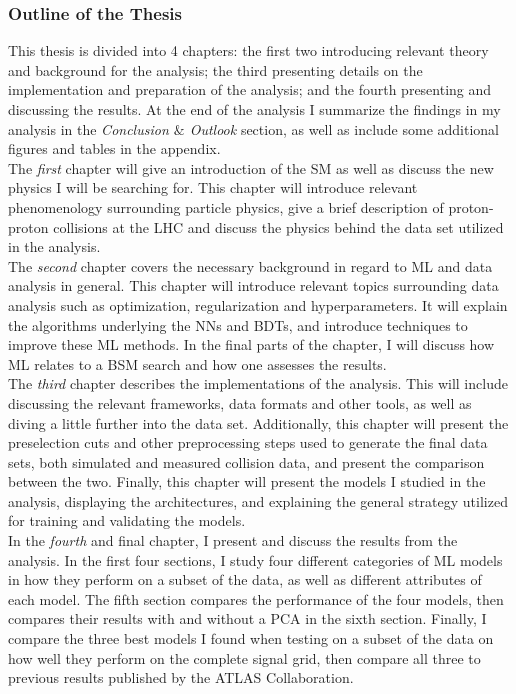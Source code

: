 \subsubsection*{Outline of the Thesis}
This thesis is divided into 4 chapters: the first two introducing relevant theory and background for the analysis; the third presenting
details on the implementation and preparation of the analysis; and the fourth presenting and discussing the results. At the end of the analysis I 
summarize the findings in my analysis in the \emph{Conclusion $\&$ Outlook} section, as well as include some additional figures and tables 
in the appendix. 
\\\newline
The \emph{first} chapter will give an introduction of the \ac{SM} as well as discuss the new physics I will be searching for. This chapter will 
introduce relevant phenomenology surrounding particle physics, give a brief description of proton-proton collisions at the \ac{LHC} and discuss 
the physics behind the data set utilized in the analysis. 
\\\newline
The \emph{second} chapter covers the necessary background in regard to \ac{ML} and data analysis in general. This chapter will introduce relevant topics
surrounding data analysis such as optimization, regularization and hyperparameters. It will explain the algorithms underlying the \ac{NN}s and 
\ac{BDT}s, and introduce techniques to improve these \ac{ML} methods. In the final parts of the chapter, I will discuss how \ac{ML} relates to 
a \acf{BSM} search and how one assesses the results.
\\\newline
The \emph{third} chapter describes the implementations of the analysis. This will include discussing the relevant frameworks, data formats and 
other tools, as well as diving a little further into the data set. Additionally, this chapter will present the preselection cuts and other preprocessing steps
used to generate the final data sets, both simulated and measured collision data, and present the comparison between the two. Finally, this chapter will present the 
models I studied in the analysis, displaying the architectures, and explaining the general strategy utilized for training and validating the models.
\\\newline
In the \emph{fourth} and final chapter, I present and discuss the results from the analysis. In the first four sections, I study four different categories of \ac{ML} models in how they 
perform on a subset of the data, as well as different attributes of each model. The fifth section compares the performance of the four models, then compares 
their results with and without a \acf{PCA} in the sixth section. Finally, I compare the three best models I found when testing on a subset of the data on how well they perform 
on the complete signal grid, then compare all three to previous results published by the \acs{ATLAS} Collaboration.



